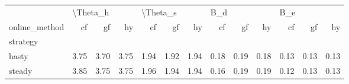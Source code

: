 \begin{tabular}{lrrrrrrrrrrrr}
\toprule
{} & \multicolumn{3}{l}{\textbackslash Theta\_h} & \multicolumn{3}{l}{\textbackslash Theta\_s} & \multicolumn{3}{l}{B\_d} & \multicolumn{3}{l}{B\_e} \\
online\_method &       cf &   gf &   hy &       cf &   gf &   hy &   cf &   gf &   hy &   cf &   gf &   hy \\
strategy &          &      &      &          &      &      &      &      &      &      &      &      \\
\midrule
hasty    &     3.75 & 3.70 & 3.75 &     1.94 & 1.92 & 1.94 & 0.18 & 0.19 & 0.18 & 0.13 & 0.13 & 0.13 \\
steady   &     3.85 & 3.75 & 3.75 &     1.96 & 1.94 & 1.94 & 0.16 & 0.19 & 0.19 & 0.12 & 0.13 & 0.13 \\
\bottomrule
\end{tabular}
